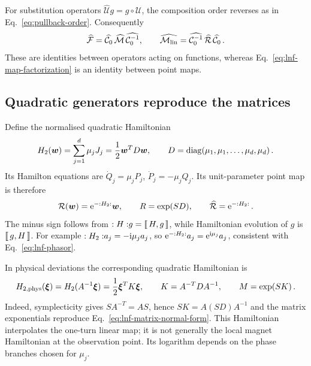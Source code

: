 For substitution operators
$\widehat{\mathcal U}g = g\circ\mathcal U$, the composition order reverses
as in Eq.~\eqref{eq:pullback-order}. Consequently
\begin{equation}\label{eq:lnf-pullback-normal-form}
    \widehat{\mathcal F} = \widehat{\mathcal C_0}\,
    \widehat{\mathcal M}\,
    \widehat{\mathcal C_0^{-1}},\qquad
    \widehat{\mathcal M_{\rm lin}} = \widehat{\mathcal C_0^{-1}}\,
    \widehat{\mathcal R}\,
    \widehat{\mathcal C_0}\,.
\end{equation}
These are identities between operators acting on functions, whereas
Eq.~\eqref{eq:lnf-map-factorization} is an identity between point maps.


\subsection{Quadratic generators reproduce the matrices}

Define the normalised quadratic Hamiltonian
\begin{equation}\label{eq:lnf-h2}
    H_2(\vec w) = \sum_{j = 1}^d\mu_j J_j = \frac12\vec w^T D\vec w,
    \qquad D = \diag(\mu_1,\mu_1,\ldots,\mu_d,\mu_d)\,.
\end{equation}
Its Hamilton equations are
$\dot Q_j = \mu_j P_j$, $\dot P_j = -\mu_j Q_j$.
Its unit-parameter point map is therefore
\begin{equation}\label{eq:lnf-rotation-lie}
    \mathcal R(\vec w) = \e^{-\lie{H_2}}\vec w,
    \qquad R = \exp(SD),\qquad
    \widehat{\mathcal R} = \e^{-\lie{H_2}}\,.
\end{equation}
The minus sign follows from $\lie{H}g = \poisson{H}{g}$, while
Hamiltonian evolution of $g$ is $\poisson{g}{H}$.
For example $\lie{H_2}a_j = -\ii\mu_j a_j$, so
$\e^{-\lie{H_2}}a_j = \e^{\ii\mu_j}a_j$, consistent with
Eq.~\eqref{eq:lnf-phasor}.

In physical deviations the corresponding quadratic Hamiltonian is
\begin{equation}\label{eq:lnf-physical-h2}
    H_{2,\rm phys}(\vec\xi) = H_2(A^{-1}\vec\xi) = \frac12\vec\xi^T K\vec\xi,
    \qquad K = A^{-T}DA^{-1},\qquad M = \exp(SK)\,.
\end{equation}
Indeed, symplecticity gives $S A^{-T} = A S$, hence
$SK = A(SD)A^{-1}$ and the matrix exponentials reproduce
Eq.~\eqref{eq:lnf-matrix-normal-form}. This Hamiltonian interpolates
the one-turn linear map; it is not generally the local magnet
Hamiltonian at the observation point. Its logarithm depends on the
phase branches chosen for $\mu_j$.

